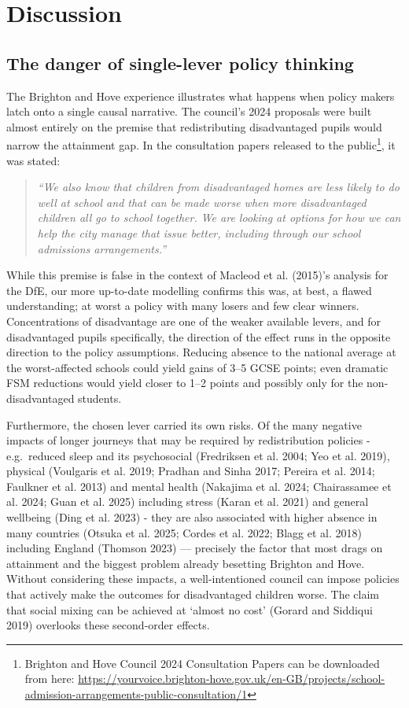 \documentclass[
  12pt,
  titlepage]{article}
\begin{document}
\section{Discussion}\label{discussion}

\subsection{The danger of single-lever policy
thinking}\label{the-danger-of-single-lever-policy-thinking}

The Brighton and Hove experience illustrates what happens when policy
makers latch onto a single causal narrative. The council's 2024
proposals were built almost entirely on the premise that redistributing
disadvantaged pupils would narrow the attainment gap. In the
consultation papers released to the public\footnote{Brighton and Hove
  Council 2024 Consultation Papers can be downloaded from here:
  \url{https://yourvoice.brighton-hove.gov.uk/en-GB/projects/school-admission-arrangements-public-consultation/1}},
it was stated:

\begin{quote}
\emph{``We also know that children from disadvantaged homes are less
likely to do well at school and that can be made worse when more
disadvantaged children all go to school together. We are looking at
options for how we can help the city manage that issue better, including
through our school admissions arrangements.''}
\end{quote}

While this premise is false in the context of Macleod et al. (2015)'s
analysis for the DfE, our more up-to-date modelling confirms this was,
at best, a flawed understanding; at worst a policy with many losers and
few clear winners. Concentrations of disadvantage are one of the weaker
available levers, and for disadvantaged pupils specifically, the
direction of the effect runs in the opposite direction to the policy
assumptions. Reducing absence to the national average at the
worst-affected schools could yield gains of 3--5 GCSE points; even
dramatic FSM reductions would yield closer to 1--2 points and possibly
only for the non-disadvantaged students.

Furthermore, the chosen lever carried its own risks. Of the many
negative impacts of longer journeys that may be required by
redistribution policies - e.g.~reduced sleep and its psychosocial
(Fredriksen et al. 2004; Yeo et al. 2019), physical (Voulgaris et al.
2019; Pradhan and Sinha 2017; Pereira et al. 2014; Faulkner et al. 2013)
and mental health (Nakajima et al. 2024; Chairassamee et al. 2024; Guan
et al. 2025) including stress (Karan et al. 2021) and general wellbeing
(Ding et al. 2023) - they are also associated with higher absence in
many countries (Otsuka et al. 2025; Cordes et al. 2022; Blagg et al.
2018) including England (Thomson 2023) --- precisely the factor that
most drags on attainment and the biggest problem already besetting
Brighton and Hove. Without considering these impacts, a well-intentioned
council can impose policies that actively make the outcomes for
disadvantaged children worse. The claim that social mixing can be
achieved at `almost no cost' (Gorard and Siddiqui 2019) overlooks these
second-order effects.
\end{document}
